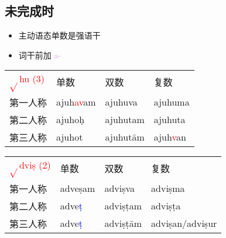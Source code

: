 \documentclass[17pt]{beamer}
\newcommand{\verbroot}[1]{\textcolor{red}{$\sqrt{}$#1}}
\newcommand{\fullpada}[1]{\textcolor{OliveGreen}{#1}}
\newcommand{\pratyaya}[1]{\textcolor{Plum}{#1}}
\newcommand{\important}[1]{\textcolor{blue}{#1}}
\begin{document}
\subsection{未完成时}
\begin{frame}{\insertsubsection}
  \small
  \begin{itemize}
    \item 主动语态单数是强语干
    \item 词干前加 \pratyaya{a\nobreakdash-}
  \end{itemize}

  \raggedright  
  \begin{tabular}{@{}llll@{}} %
    \verbroot{hu (3)} & 单数  & 双数  & 复数 \\
    第一人称 & \cellcolor{light-gray}\fullpada{ajuh\textcolor{red}{av}am} & \fullpada{ajuhuva}  & \fullpada{ajuhuma}  \\
    第二人称 & \cellcolor{light-gray}\fullpada{ajuhoḥ} & \fullpada{ajuhutam} & \fullpada{ajuhuta}  \\
    第三人称 & \cellcolor{light-gray}\fullpada{ajuhot} & \fullpada{ajuhutām} & \fullpada{ajuh\textcolor{red}{v}an}  \\
  \end{tabular} 
  \bigskip
    
  \begin{tabular}{@{}llll@{}} %
    \verbroot{dviṣ (2)} & 单数  & 双数  & 复数 \\
    第一人称 & \cellcolor{light-gray}\fullpada{adveṣam} & \fullpada{adviṣva} & \fullpada{adviṣma} \\
    第二人称 & \cellcolor{light-gray}\fullpada{adve\important{ṭ}} & \fullpada{adviṣṭam} & \fullpada{adviṣṭa} \\
    第三人称 & \cellcolor{light-gray}\fullpada{adve\important{ṭ}} & \fullpada{adviṣṭām} & \fullpada{adviṣan/adviṣur} \\
  \end{tabular}   
\end{frame}
\end{document}
